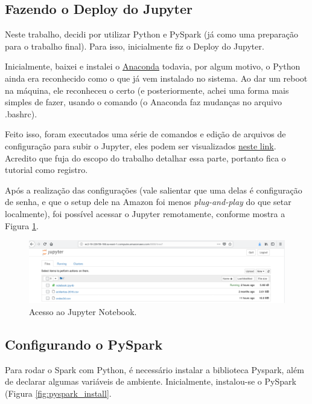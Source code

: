 \documentclass{article}
\begin{document}
\subsection{Fazendo o Deploy do Jupyter}

Neste trabalho, decidi por utilizar Python e PySpark (já como uma preparação para o trabalho final). Para isso, inicialmente fiz o Deploy do Jupyter.

Inicialmente, baixei e instalei o \href{https://www.anaconda.com/download/#linux}{Anaconda} todavia, por algum motivo, o Python ainda era reconhecido como o que já vem instalado no sistema. Ao dar um reboot na máquina, ele reconheceu o certo (e posteriormente, achei uma forma mais simples de fazer, usando o comando  (o Anaconda faz mudanças no arquivo .bashrc).

Feito isso, foram executados uma série de comandos e edição de arquivos de configuração para subir o Jupyter, eles podem ser visualizados \href{https://medium.com/@josemarcialportilla/getting-spark-python-and-jupyter-notebook-running-on-amazon-ec2-dec599e1c297}{neste link}. Acredito que fuja do escopo do trabalho detalhar essa parte, portanto fica o tutorial como registro.

Após a realização das configurações (vale salientar que uma delas é configuração de senha, e que o setup dele na Amazon foi menos \emph{plug-and-play} do que setar localmente), foi possível acessar o Jupyter remotamente, conforme mostra a Figura \ref{fig:acess_jupyter}.

\begin{figure}[h]
  \includegraphics[width=\linewidth]{img/jupyter_access.png}
  \caption{Acesso ao Jupyter Notebook.}
  \label{fig:acess_jupyter}
\end{figure}

\subsection{Configurando o PySpark}

Para rodar o Spark com Python, é necessário instalar a biblioteca Pyspark, além de declarar algumas variáveis de ambiente. Inicialmente, instalou-se o PySpark (Figura \ref{fig:pyspark_install}.
\end{document}
